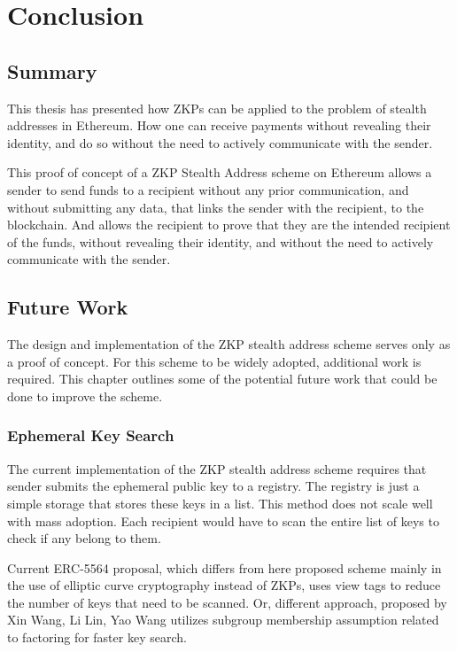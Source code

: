 \chapter{Conclusion}

\section{Summary}

This thesis has presented how ZKPs can be applied to the problem of stealth
addresses in Ethereum. How one can receive payments without revealing their
identity, and do so without the need to actively communicate with the sender.

This proof of concept of a ZKP Stealth Address scheme on Ethereum allows
a sender to send funds to a recipient without any prior communication, and
without submitting any data, that links the sender with the recipient, to the blockchain.
And allows the recipient to prove that they are the intended recipient of the
funds, without revealing their identity, and without the need to actively
communicate with the sender.


\section{Future Work}

The design and implementation of the ZKP stealth address scheme serves only as
a proof of concept. For this scheme to be widely adopted, additional work is
required. This chapter outlines some of the potential future work that could be
done to improve the scheme.

\subsection*{Ephemeral Key Search}

The current implementation of the ZKP stealth address scheme requires that sender
submits the ephemeral public key to a registry. The registry is just a simple
storage that stores these keys in a list. This method does not scale well with
mass adoption. Each recipient would have to scan the entire list of keys to
check if any belong to them.

Current ERC-5564\cite{ethereumERC5564Stealth} proposal, which differs from
here proposed scheme mainly in the use of elliptic curve cryptography instead
of ZKPs, uses view tags to reduce the number of keys that need to be scanned.
Or, different approach, proposed by Xin Wang, Li Lin, Yao Wang \cite{Wang2023}
utilizes subgroup membership assumption related to factoring for faster key
search.

